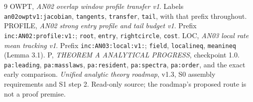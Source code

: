 \documentclass[11pt]{article}
\theoremstyle{remark}\newtheorem{remark}[theorem]{Remark}
\begin{document}
\begin{thebibliography}{9}\small
{} OWPT, \emph{AN02 overlap window profile transfer v1}.
Labels \texttt{an02owptv1:jacobian}, \texttt{tangents},
\texttt{transfer}, \texttt{tail}, with that prefix throughout.
 PROFILE, \emph{AN02 strong entry profile and tail
budget v1}. Prefix \texttt{inc:AN02:profile:v1:};
\texttt{root}, \texttt{entry}, \texttt{rightcircle}, \texttt{cost}.
 LOC, \emph{AN03 local rate mean tracking v1}.
Prefix \texttt{inc:AN03:local:v1:}; \texttt{field},
\texttt{localineq}, \texttt{meanineq} (Lemma 3.1).
 P, \emph{THEOREM A ANALYTICAL PROGRESS}, checkpoint 1.0.
\texttt{pa:leading}, \texttt{pa:masslaws}, \texttt{pa:resident},
\texttt{pa:spectra}, \texttt{pa:order}, and the exact early comparison.
 \emph{Unified analytic theory roadmap}, v1.3,
S0 assembly requirements and S1 step 2. Read-only source;
the roadmap's proposed route is not a proof premise.
\end{thebibliography}
\end{document}
